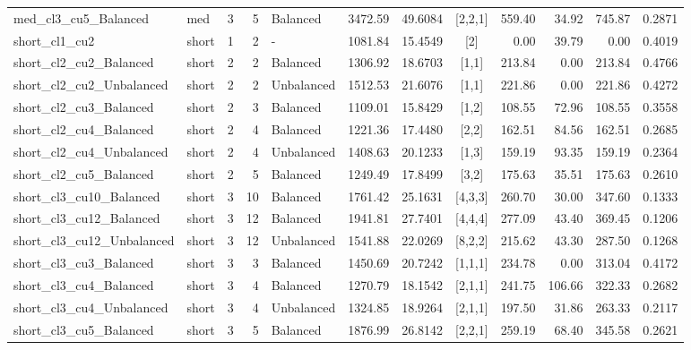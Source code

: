\documentclass[3p,11pt,authoryear]{elsarticle}  %
\begin{document}
\begin{table}
{\begin{tabular}{@{}l l r r l r r c r r r r@{}}
med\_cl3\_cu5\_Balanced & med & 3 & 5 & Balanced & 3472.59 & 49.6084 & [2,2,1] & 559.40 & 34.92 & 745.87 & 0.2871 \\
short\_cl1\_cu2 & short & 1 & 2 & - & 1081.84 & 15.4549 & [2] & 0.00 & 39.79 & 0.00 & 0.4019 \\
short\_cl2\_cu2\_Balanced & short & 2 & 2 & Balanced & 1306.92 & 18.6703 & [1,1] & 213.84 & 0.00 & 213.84 & 0.4766 \\
short\_cl2\_cu2\_Unbalanced & short & 2 & 2 & Unbalanced & 1512.53 & 21.6076 & [1,1] & 221.86 & 0.00 & 221.86 & 0.4272 \\
short\_cl2\_cu3\_Balanced & short & 2 & 3 & Balanced & 1109.01 & 15.8429 & [1,2] & 108.55 & 72.96 & 108.55 & 0.3558 \\
short\_cl2\_cu4\_Balanced & short & 2 & 4 & Balanced & 1221.36 & 17.4480 & [2,2] & 162.51 & 84.56 & 162.51 & 0.2685 \\
short\_cl2\_cu4\_Unbalanced & short & 2 & 4 & Unbalanced & 1408.63 & 20.1233 & [1,3] & 159.19 & 93.35 & 159.19 & 0.2364 \\
short\_cl2\_cu5\_Balanced & short & 2 & 5 & Balanced & 1249.49 & 17.8499 & [3,2] & 175.63 & 35.51 & 175.63 & 0.2610 \\
short\_cl3\_cu10\_Balanced & short & 3 & 10 & Balanced & 1761.42 & 25.1631 & [4,3,3] & 260.70 & 30.00 & 347.60 & 0.1333 \\
short\_cl3\_cu12\_Balanced & short & 3 & 12 & Balanced & 1941.81 & 27.7401 & [4,4,4] & 277.09 & 43.40 & 369.45 & 0.1206 \\
short\_cl3\_cu12\_Unbalanced & short & 3 & 12 & Unbalanced & 1541.88 & 22.0269 & [8,2,2] & 215.62 & 43.30 & 287.50 & 0.1268 \\
short\_cl3\_cu3\_Balanced & short & 3 & 3 & Balanced & 1450.69 & 20.7242 & [1,1,1] & 234.78 & 0.00 & 313.04 & 0.4172 \\
short\_cl3\_cu4\_Balanced & short & 3 & 4 & Balanced & 1270.79 & 18.1542 & [2,1,1] & 241.75 & 106.66 & 322.33 & 0.2682 \\
short\_cl3\_cu4\_Unbalanced & short & 3 & 4 & Unbalanced & 1324.85 & 18.9264 & [2,1,1] & 197.50 & 31.86 & 263.33 & 0.2117 \\
short\_cl3\_cu5\_Balanced & short & 3 & 5 & Balanced & 1876.99 & 26.8142 & [2,2,1] & 259.19 & 68.40 & 345.58 & 0.2621 \\
\bottomrule 
\end{tabular}%
}
\end{table}
\end{document}
